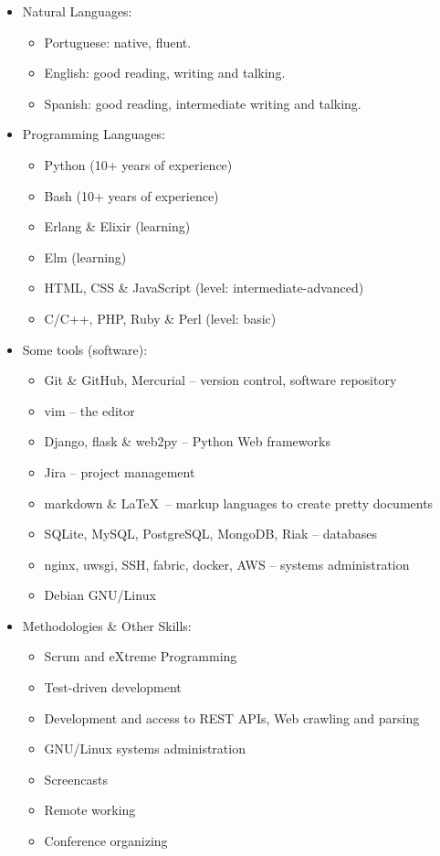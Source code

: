 \documentclass[a4paper,11pt]{article}
\begin{document}
	\begin{itemize}
		\item Natural Languages:
		\begin{itemize}
			\item Portuguese: native, fluent.
			\item English: good reading, writing and talking.
			\item Spanish: good reading, intermediate writing and talking.
		\end{itemize}
	\item Programming Languages:
		\begin{itemize}
			\item Python (10+ years of experience)
			\item Bash (10+ years of experience)
			\item Erlang \& Elixir (learning)
			\item Elm (learning)
			\item HTML, CSS \& JavaScript (level: intermediate-advanced)
			\item C/C++, PHP, Ruby \& Perl (level: basic)
		\end{itemize}
		\item Some tools (software):
		\begin{itemize}
			\item Git \& GitHub, Mercurial -- version control, software
				repository
			\item vim -- the editor
			\item Django, flask \& web2py -- Python Web frameworks
			\item Jira -- project management
			\item markdown \& \LaTeX\ -- markup languages to create pretty
				documents
			\item SQLite, MySQL, PostgreSQL, MongoDB, Riak -- databases
			\item nginx, uwsgi, SSH, fabric, docker, AWS -- systems
				administration
			\item Debian GNU/Linux
		\end{itemize}
		\item Methodologies \& Other Skills:
		\begin{itemize}
			\item Scrum and eXtreme Programming
			\item Test-driven development
			\item Development and access to REST APIs, Web crawling and parsing
			\item GNU/Linux systems administration
			\item Screencasts
			\item Remote working
			\item Conference organizing
		\end{itemize}
	\end{itemize}
\end{document}
